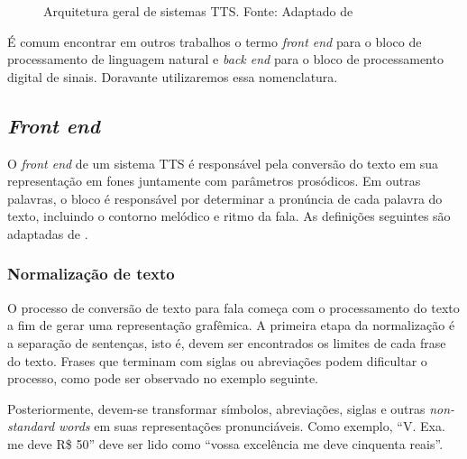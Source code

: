 \begin{figure}[!htbp]
\centering
{}
\caption[Arquitetura geral de sistemas TTS]{Arquitetura geral de sistemas TTS. Fonte: Adaptado de }
\label{fig:tts-arch}
\end{figure}

É comum encontrar em outros trabalhos o termo \emph{front end} para o
bloco de processamento de linguagem natural e \emph{back end} para o bloco de
processamento digital de sinais. Doravante utilizaremos essa nomenclatura.

\subsection{\emph{Front end}}
O \emph{front end} de um sistema TTS é responsável pela conversão do texto em
sua representação em fones juntamente com parâmetros prosódicos. Em outras
palavras, o bloco é responsável por determinar a pronúncia de cada palavra do
texto, incluindo o contorno melódico e ritmo da fala. As definições seguintes
são adaptadas de .

\subsubsection{Normalização de texto}
O processo de conversão de texto para fala começa com o processamento do texto a
fim de gerar uma representação grafêmica. A primeira etapa da normalização é a
separação de sentenças, isto é, devem ser encontrados os limites de cada frase
do texto. Frases que terminam com siglas ou abreviações podem dificultar o
processo, como pode ser observado no exemplo seguinte.

Posteriormente, devem-se transformar símbolos, abreviações, siglas e outras
\emph{non-standard words} em suas representações pronunciáveis. Como exemplo,
``V. Exa. me deve R\$ 50'' deve ser lido como ``vossa excelência me deve
cinquenta reais''.

